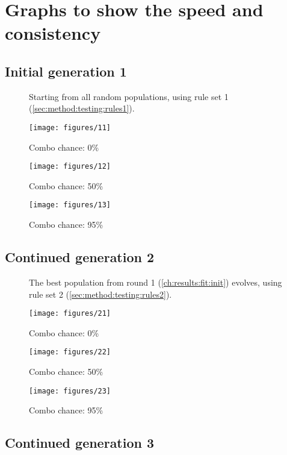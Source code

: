\section{Graphs to show the speed and consistency}
\label{all_gens}

\subsection{Initial generation 1}
\label{fig:inital}

\begin{figure*}[hbt]
	\caption[From random to rules 1]{Starting from all random populations, using rule set 1 (\ref{sec:method:testing:rules1}).}
	
	\texttt{[image: figures/11]}%
	\caption{Combo chance: 0\%}%
	\label{fig:random_to_r1:c0}%
	
	\texttt{[image: figures/12]}%
	\caption{Combo chance: 50\%}%
	\label{fig:random_to_r1:c50}%
	
	\texttt{[image: figures/13]} %
	\label{fig:random_to_r1:c95}%
	\caption{Combo chance: 95\%}%
\end{figure*}



\subsection{Continued generation 2}
\label{fig:continued2}

\begin{figure*}[hbt]
	\caption[From rules 1 to rules 2]{The best population from round 1 (\ref{ch:results:fit:init}) evolves, using  rule set 2 (\ref{sec:method:testing:rules2}).} 
	
	\texttt{[image: figures/21]}%
	\label{fig:r1_to_r2:c0}%
	\caption{Combo chance: 0\%}%
	
	\texttt{[image: figures/22]}%
	\label{fig:r1_to_r2:c50}%
	\caption{Combo chance: 50\%}%
	
	\texttt{[image: figures/23]} %
	\label{fig:r1_to_r2:c95}%
	\caption{Combo chance: 95\%}%
\end{figure*}



\subsection{Continued generation 3}
\label{fig:continued3} 

